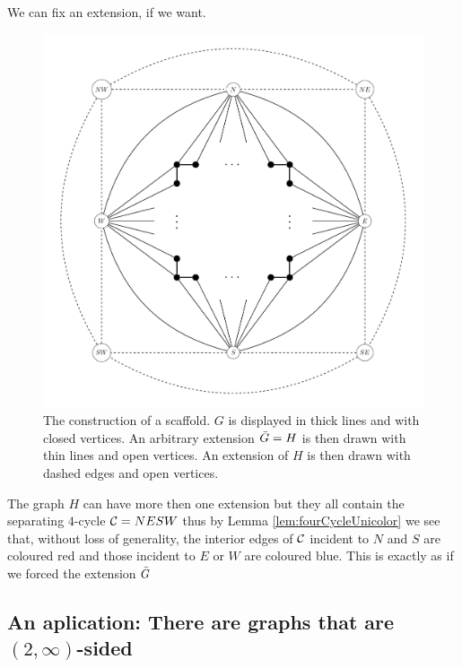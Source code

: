 \begin{thrm}
\label{th:fixExtension}
We can fix an extension, if we want.
\end{thrm}

\begin{figure}[h!]
\centering
\includegraphics[scale=0.5]{prelim/img/scafold}

\caption{The construction of a scaffold. $G$ is displayed in thick lines and with closed vertices. An arbitrary extension $\bar{G} =H$ is then drawn with thin lines and open vertices. An extension of $H$ is then drawn with dashed edges and open vertices. 
    \label{fig:scafold}}
\end{figure}

The graph $H$ can have more then one extension but they all contain the separating $4$-cycle $\mathcal{C}= NESW$ thus by Lemma \ref{lem:fourCycleUnicolor} we see that, without loss of generality, the interior edges of $\mathcal{C}$ incident to $N$ and $S$ are coloured red and those incident to $E$ or $W$ are coloured blue. This is exactly as if we forced the extension $\bar{G}$

\subsection{An aplication: There are graphs that are $(2, \infty)$-sided}


